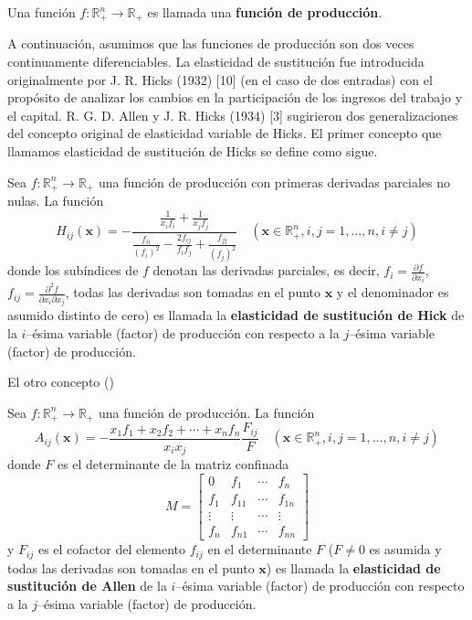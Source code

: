 \documentclass[a4paper,fleqn]{cas-dc}
\begin{document}
\begin{definition}
Una función $f\colon\mathds{R}^{n}_{+}\rightarrow\mathds{R}_{+}$ es llamada una \textbf{función de producción}.
\end{definition}
A continuación, asumimos que las funciones de producción son dos veces continuamente diferenciables. La elasticidad de sustitución fue introducida originalmente por J. R. Hicks (1932) [10] (en el caso de dos entradas) con el propósito de analizar los cambios en la participación de los ingresos del trabajo y el capital. R. G. D. Allen y J. R. Hicks (1934) [3] sugirieron dos generalizaciones del concepto original de elasticidad variable de Hicks. El primer concepto que llamamos elasticidad de sustitución de Hicks se define como sigue.
\begin{definition}
Sea $f\colon\mathds{R}^{n}_{+}\rightarrow\mathds{R}_{+}$ una función de producción con primeras derivadas parciales no nulas. La función
\begin{equation}
H_{ij}\left(\bm{x}\right)=-\frac{\frac{1}{x_{i}f_{i}}+\frac{1}{x_{j}f_{j}}}{\frac{f_{ii}}{{\left(f_{i}\right)}^{2}}-\frac{2f_{ij}}{f_{i}f_{j}}+\frac{f_{jj}}{{\left(f_{j}\right)}^{2}}}\quad\left(\bm{x}\in\mathds{R}^{n}_{+},i,j=1,\ldots,n,i\neq j\right)
\end{equation}
donde los subíndices de $f$ denotan las derivadas parciales, es decir, $f_{i}=\frac{\partial f}{\partial x_{i}}$, $f_{ij}=\frac{\partial^{2}f}{\partial x_{i}\partial x_{j}}$, todas las derivadas son tomadas en el punto $\bm{x}$ y el denominador es asumido distinto de cero) es llamada la \textbf{elasticidad de sustitución de Hick} de la $i$--ésima variable (factor) de producción con respecto a la $j$--ésima variable (factor) de producción.
\end{definition}
El otro concepto () %
\begin{definition}
Sea $f\colon\mathds{R}^{n}_{+}\rightarrow\mathds{R}_{+}$ una función de producción. La función
\begin{equation}
A_{ij}\left(\bm{x}\right)=-\frac{x_{1}f_{1}+x_{2}f_{2}+\cdots+x_{n}f_{n}}{x_{i}x_{j}}\frac{F_{ij}}{F}\quad\left(\bm{x}\in\mathds{R}^{n}_{+},i,j=1,\ldots,n,i\neq j\right)
\end{equation}
donde $F$ es el determinante de la matriz confinada
\begin{equation}
M=
\begin{bmatrix}
0 & f_{1} & \cdots & f_{n}\\
f_{1} & f_{11} & \cdots & f_{1n}\\
\vdots & \vdots & \cdots & \vdots\\
f_{n} & f_{n1} & \cdots & f_{nn}
\end{bmatrix}
\end{equation}
y $F_{ij}$ es el cofactor del elemento $f_{ij}$ en el determinante $F$ ($F\neq0$ es asumida y todas las derivadas son tomadas en el punto $\bm{x}$) es llamada la \textbf{elasticidad de sustitución de Allen} de la $i$--ésima variable (factor) de producción con respecto a la $j$--ésima variable (factor) de producción.
\end{definition}
\end{document}

